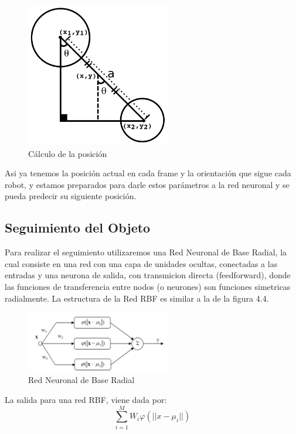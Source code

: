 \documentclass[conference]{IEEEtran}
\begin{document}
\begin{figure}
\centering
\includegraphics[width=2.5in]{imagen2.pdf}
\caption{C\'alculo de la posici\'on}
\label{fig_cir}
\end{figure}
Asi ya tenemos la posici\'on actual en cada frame y la orientaci\'on que sigue cada robot, y estamos preparados para darle estos par\'ametros a la red neuronal  y se pueda predecir su siguiente posici\'on.


\subsection{Seguimiento del Objeto}
Para realizar el seguimiento utilizaremos una Red Neuronal de Base Radial, la cual consiste en una red con una  capa de unidades ocultas, conectadas a las entradas y una neurona de salida, con transmicion directa (feedforward), donde las funciones de transferencia entre nodos (o neurones) son funciones simetricas radialmente. La estructura de la Red RBF es similar a la de la figura 4.4.
\begin{figure}
\centering
\includegraphics[width=2.5in]{RBF.pdf}
\caption{Red Neuronal de Base Radial }
\label{fig_cir}
\end{figure}

La salida para una red RBF, viene dada por: 
\[
\sum_{i=1}^{M}W_{i}\varphi(||x-\mu_i||)
\]
\end{document}
